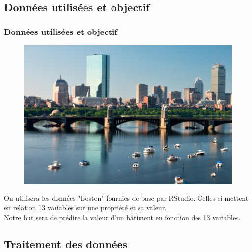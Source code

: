 \documentclass[compress]{beamer}
\begin{document}
		\subsection{Données utilisées et objectif}
		\begin{frame}
			\frametitle{Données utilisées et objectif}
			\begin{figure}
				\vspace{-2em}
				\includegraphics[width=\linewidth]{img/boston}
			\end{figure}
			On utilisera les données "Boston" fournies de base par RStudio. Celles-ci mettent en relation 13 variables sur une propriété et sa valeur.
			\\
			Notre but sera de prédire la valeur d'un bâtiment en fonction des 13 variables.
			
		\end{frame}
		
			
		\subsection{Traitement des données}
\end{document}
